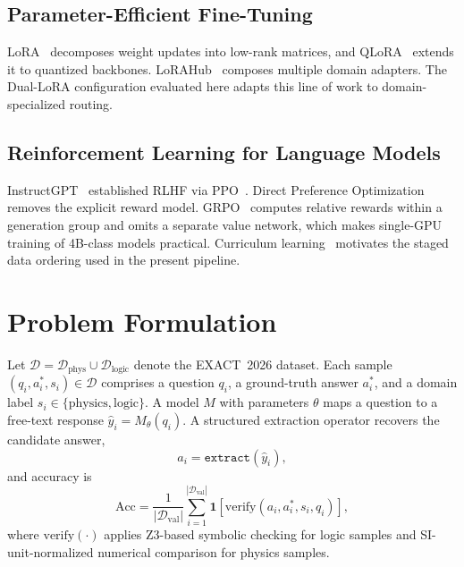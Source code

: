 \documentclass[preprint,12pt]{elsarticle}
\newcommand{\dataset}{EXACT~2026}
\begin{document}
\subsection{Parameter-Efficient Fine-Tuning}
LoRA~\cite{Hu2022} decomposes weight updates into low-rank matrices, and
QLoRA~\cite{Dettmers2023} extends it to quantized backbones.
LoRAHub~\cite{Huang2023} composes multiple domain adapters. The Dual-LoRA
configuration evaluated here adapts this line of work to domain-specialized
routing.

\subsection{Reinforcement Learning for Language Models}
InstructGPT~\cite{Ouyang2022} established RLHF via PPO~\cite{Schulman2017}.
Direct Preference Optimization~\cite{Rafailov2023} removes the explicit
reward model. GRPO~\cite{Shao2024} computes relative rewards within a
generation group and omits a separate value network, which makes
single-GPU training of 4B-class models practical. Curriculum
learning~\cite{Bengio2009} motivates the staged data ordering used in the
present pipeline.

\section{Problem Formulation}
\label{sec:problem}

Let $\mathcal{D}=\mathcal{D}_{\text{phys}}\cup\mathcal{D}_{\text{logic}}$
denote the \dataset{} dataset. Each sample
$(q_i,a_i^{*},s_i)\in\mathcal{D}$ comprises a question $q_i$, a
ground-truth answer $a_i^{*}$, and a domain label
$s_i\in\{\text{physics},\text{logic}\}$. A model $M$ with parameters
$\theta$ maps a question to a free-text response
$\hat{y}_i=M_\theta(q_i)$. A structured extraction operator recovers the
candidate answer,
\begin{equation}
  a_i=\texttt{extract}(\hat{y}_i),
\end{equation}
and accuracy is
\begin{equation}
  \mathrm{Acc}=\frac{1}{|\mathcal{D}_{\text{val}}|}
  \sum_{i=1}^{|\mathcal{D}_{\text{val}}|}
  \mathbf{1}\!\left[\mathrm{verify}(a_i,a_i^{*},s_i,q_i)\right],
\end{equation}
where $\mathrm{verify}(\cdot)$ applies Z3-based symbolic checking for logic
samples and SI-unit-normalized numerical comparison for physics samples.
\end{document}
